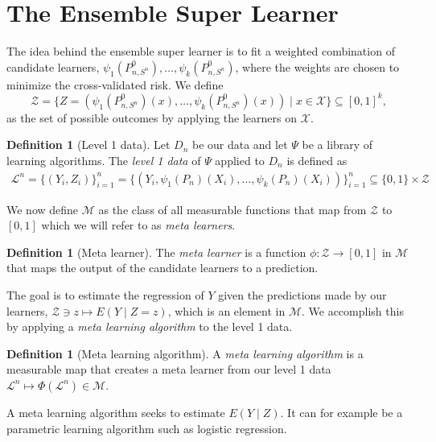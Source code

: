 \documentclass[11pt, a4paper]{article}
\theoremstyle{definition}
\newtheorem{definition}[theorem]{Definition}
\theoremstyle{remark}
\newcommand{\ml}{k}
\newcommand{\la}{\psi}
\newcommand{\Sn}{S^n}
\newcommand{\lib}{\Psi}
\newcommand{\lone}{\mathcal{L}}
\newcommand{\meta}{\phi}
\newcommand{\Meta}{\Phi}
\begin{document}
\section{The Ensemble Super Learner}
The idea behind the ensemble super learner is to fit a weighted combination of candidate learners, $\la_1(P_{n, \Sn}^{0}), \ldots, \la_k(P_{n, \Sn}^0) $, where the weights are chosen to minimize the cross-validated risk. We define 
$$ \mathcal{Z} = \{Z = (\la_1(P_{n, \Sn}^{0})(x), \ldots, \la_k(P_{n, \Sn}^0)(x) ) \mid x \in \mathcal{X} \} \subseteq [0,1]^{k}, $$
as the set of possible outcomes by applying the learners on $ \mathcal{X} $. 

\begin{definition}[Level 1 data]
    Let $ D_n $ be our data and let $ \lib $ be a library of learning algorithms. The \textit{level 1 data} of $ \lib $ applied to $ D_n $ is defined as  
    \begin{align*}
        \lone^{n} = \{(Y_i , Z_i)\}_{i = 1}^{n} = \{ (Y_i, \la_1(P_n)(X_i), \ldots, \la_\ml(P_n)(X_i)) \}_{i = 1}^n \subseteq \{0,1\} \times \mathcal{Z}  
    \end{align*}
\end{definition}
We now define $ \mathcal{M} $ as the class of all measurable functions that map from $ \mathcal{Z} $ to $ [0,1] $ which we will refer to as \textit{meta learners}. 
\begin{definition}[Meta learner]
    The \textit{meta learner} is a function $ \meta: \mathcal{Z} \to [0,1] $ in $ \mathcal{M} $ that maps the output of the candidate learners to a prediction. 
\end{definition}
The goal is to estimate the regression of $ Y $ given the predictions made by our learners, $ \mathcal{Z} \ni z \mapsto E(Y \mid Z = z) $, which is an element in $ \mathcal{M} $. We accomplish this by applying a \textit{meta learning algorithm} to the level 1 data. 
\begin{definition}[Meta learning algorithm]
    A \textit{meta learning algorithm} is a measurable map that creates a meta learner from our level 1 data $ \lone^{n} \mapsto \Meta(\lone^{n}) \in \mathcal{M} $. 
\end{definition}
A meta learning algorithm seeks to estimate $ E (Y \mid Z) $. It can for example be a parametric learning algorithm such as logistic regression. 
\end{document}
